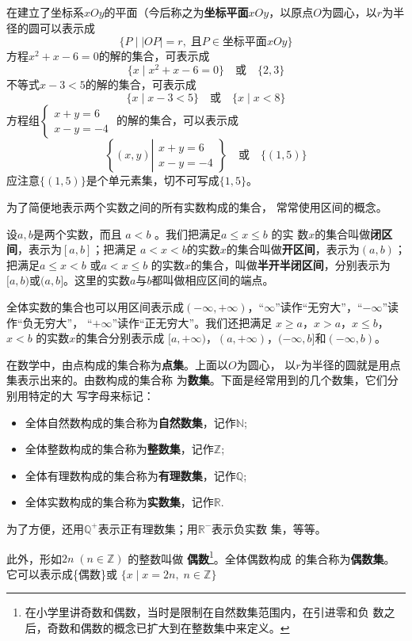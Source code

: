 在建立了坐标系$xOy$的平面（今后称之为\textbf{坐标平面}$xOy$，以原点$O$为圆心，以$r$为半径的圆可以表示成
\[\{P\mid  |OP|=r,\; \text{且}P\in \text{坐标平面}xOy\}\]
方程$x^2+x-6=0$的解的集合，可表示成
\[\{x\mid x^2+x-6=0\}\quad \text{或}\quad \{2,3\}\]
不等式$x-3<5$的解的集合，可表示成
\[\{x\mid x-3<5\}\quad \text{或}\quad \{x\mid x<8\}\]
方程组$\begin{cases}
    x+y=6\\x-y=-4
\end{cases}$
的解的集合，可以表示成
\[\left\{(x,y)\left|\begin{array}{l}
    x+y=6\\x-y=-4
\end{array}\right.\right\}\quad \text{或}\quad \{(1,5)\}\]
应注意$\{(1,5)\}$是个单元素集，切不可写成$\{1,5\}$。

为了简便地表示两个实数之间的所有实数构成的集合，
常常使用区间的概念。

设$a,b$是两个实数，而且
$a<b$
。我们把满足$a\le x\le b$
的实
数$x$的集合叫做\textbf{闭区间}，表示为$[a,b]$；把满足
$a<x<b$的实数$x$的集合叫做\textbf{开区间}，表示为$(a,b)$；
把满足$a\le x<b$
或$a<x\le b$
的实数$x$的集合，叫做\textbf{半开半闭区间}，分别表示为
$[a,b)$或$(a,b]$。这里的实数$a$与$b$都叫做相应区间的端点。

全体实数的集合也可以用区间表示成$(-\infty,+\infty)$，“$\infty$”读作“无穷大”，“$-\infty$”读作“负无穷大”，
“$+\infty$”读作“正无穷大”。我们还把满足
$x\ge a$，$x>a$，$x\le b$，$x<b$
的实数$x$的集合分别表示成
$[a,+\infty)$，$(a,+\infty)$，$(-\infty,b]$和$(-\infty, b)$。

在数学中，由点构成的集合称为\textbf{点集}。上面以$O$为圆心，
以$r$为半径的圆就是用点集表示出来的。由数构成的集合称
为\textbf{数集}。下面是经常用到的几个数集，它们分别用特定的大
写字母来标记：
\begin{itemize}
\item 全体自然数构成的集合称为\textbf{自然数集}，记作$\mathbb{N}$;
\item 全体整数构成的集合称为\textbf{整数集}，记作$\mathbb{Z}$;
\item 全体有理数构成的集合称为\textbf{有理数集}，记作$\mathbb{Q}$;
\item 全体实数构成的集合称为\textbf{实数集}，记作$\mathbb{R}$.
\end{itemize}

为了方便，还用$\mathbb{Q}^+$表示正有理数集；用$\mathbb{R}^-$表示负实数
集，等等。

此外，形如$2n\; (n\in\mathbb{Z})$
的整数叫做 \textbf{偶数}\footnote{在小学里讲奇数和偶数，当时是限制在自然数集范围内，在引进零和负
数之后，奇数和偶数的概念已扩大到在整数集中来定义。}。全体偶数构成
的集合称为\textbf{偶数集}。它可以表示成\{偶数\}或
$\{x\mid x=2n,\; n\in\mathbb{Z}\}$

